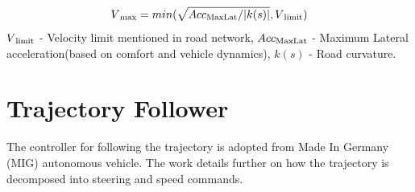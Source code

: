 \begin{equation}
    V\textsubscript{max} = min(\sqrt{Acc\textsubscript{MaxLat} / |k(s)|} , V\textsubscript{limit})
\label{max_vel}
\end{equation}
$V\textsubscript{limit}$ - Velocity limit mentioned in road network,
$Acc\textsubscript{MaxLat}$ - Maximum Lateral acceleration(based on comfort and vehicle dynamics),
$k(s)$ - Road curvature.

\section{Trajectory Follower} \label{traj_follower}

The controller for following the trajectory is adopted from Made In Germany (MIG) autonomous vehicle. The work \cite{mig_controller} details further on how the trajectory is decomposed into steering and speed commands. 
